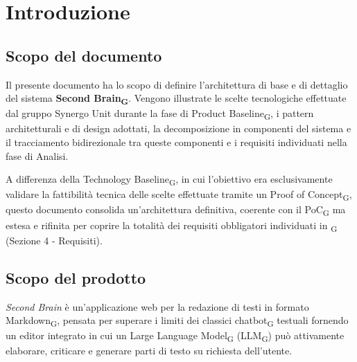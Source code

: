 \section{Introduzione}

\subsection{Scopo del documento}
Il presente documento ha lo scopo di definire l'architettura di base e di dettaglio del sistema \textbf{Second Brain\textsubscript{G}}. Vengono illustrate le scelte tecnologiche effettuate dal gruppo Synergo Unit durante la fase di Product Baseline\textsubscript{G}, i pattern architetturali e di design adottati, la decomposizione in componenti del sistema e il tracciamento bidirezionale tra queste componenti e i requisiti individuati nella fase di Analisi.

A differenza della Technology Baseline\textsubscript{G}, in cui l'obiettivo era esclusivamente validare la fattibilità tecnica delle scelte effettuate tramite un Proof of Concept\textsubscript{G}, questo documento consolida un'architettura definitiva, coerente con il PoC\textsubscript{G} ma estesa e rifinita per coprire la totalità dei requisiti obbligatori individuati in \textsubscript{G} (Sezione 4 - Requisiti).

\subsection{Scopo del prodotto}
\textit{Second Brain} è un'applicazione web per la redazione di testi in formato Markdown\textsubscript{G}, pensata per superare i limiti dei classici chatbot\textsubscript{G} testuali fornendo un editor integrato in cui un Large Language Model\textsubscript{G} (LLM\textsubscript{G}) può attivamente elaborare, criticare e generare parti di testo su richiesta dell'utente.

